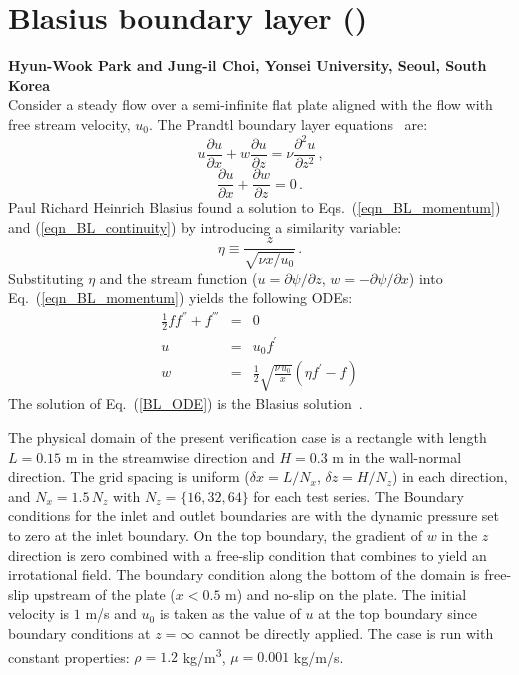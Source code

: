 \documentclass[11pt]{book}
\begin{document}
\section{Blasius boundary layer (\texorpdfstring{}{blasius})}
\label{sec:blasius}

\textbf{Hyun-Wook Park and Jung-il Choi, Yonsei University, Seoul, South Korea}\\

\noindent Consider a steady flow over a semi-infinite flat plate aligned with the flow with free stream velocity, $u_0$. The Prandtl boundary layer equations~\cite{Panton:1} are:
\begin{equation}
\label{eqn_BL_momentum}
u \frac{\partial u}{\partial x} + w \frac{\partial u}{\partial z} = \nu \frac{\partial^2 u}{\partial z^2} \,\mbox{,}
\end{equation}
\begin{equation}
\label{eqn_BL_continuity}
\frac{\partial u}{\partial x}+\frac{\partial w}{\partial z} = 0 \,\mbox{.}
\end{equation}
Paul Richard Heinrich Blasius found a solution to Eqs.~(\ref{eqn_BL_momentum}) and (\ref{eqn_BL_continuity}) by introducing a similarity variable:
\begin{equation}
\label{eta}
\eta\equiv\frac{z}{\sqrt{\nu x/u_0}} \,\mbox{.}
\end{equation}
Substituting $\eta$ and the stream function ($u = \partial \psi/\partial z$, $w = -\partial \psi/\partial x$) into Eq.~(\ref{eqn_BL_momentum}) yields the following ODEs:
\begin{eqnarray}
\label{BL_ODE}
\frac{1}{2}f f^{''}+f^{'''}&=&0 \\
u&=&u_0 f^{'} \\
w&=&\frac{1}{2}\sqrt{\frac{\nu \,u_0}{x}}(\eta f^{'}-f)
\end{eqnarray}
The solution of Eq.~(\ref{BL_ODE}) is the Blasius solution~\cite{Panton:1}.

The physical domain of the present verification case is a rectangle with length $L=0.15$ m in the streamwise direction and $H=0.3$ m in the wall-normal direction. The grid spacing is uniform ($\delta x = L/N_x$, $\delta z =H/N_z$) in each direction, and $N_x = 1.5 \, N_z$ with $N_z = \{16, 32, 64\}$ for each test series. The Boundary conditions for the inlet and outlet boundaries are  with the dynamic pressure set to zero at the inlet boundary. On the top boundary, the gradient of $w$ in the $z$ direction is zero combined with a free-slip condition that combines to yield an irrotational field. The boundary condition along the bottom of the domain is free-slip upstream of the plate ($x<0.5$ m) and no-slip on the plate. The initial velocity is $1$ m/s and $u_0$ is taken as the value of $u$ at the top boundary since boundary conditions at $z=\infty$ cannot be directly applied. The case is run with constant properties: $\rho=1.2$ \si{kg/m^3}, $\mu = 0.001$ kg/m/s.
\end{document}
